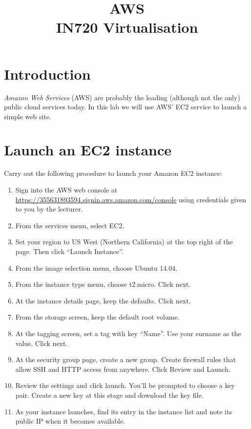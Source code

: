 \documentclass{article}
\begin{document}
\title{AWS\\ IN720 Virtualisation}
\date{}
\maketitle

\section*{Introduction}
\emph{Amazon Web Services} (AWS) are probably the leading (although not the only) public cloud services today. In this lab we will use AWS' EC2 service to launch a simple web site.

\section{Launch an EC2 instance}

Carry out the following procedure to launch your Amazon EC2 instance:

\begin{enumerate}

\item Sign into the AWS web console at \url{https://355631893594.signin.aws.amazon.com/console} using credentials given to you by the lecturer.

\item From the services menu, select EC2.

\item Set your region to US West (Northern California) at the top right of the page. Then click ``Launch Instance''.

\item From the image selection menu, choose Ubuntu 14.04.

\item From the instance type menu, choose t2.micro.  Click next.

\item At the instance details page, keep the defaults. Click next.

\item From the storage screen, keep the default root volume.

\item At the tagging screen, set a tag with key ``Name''. Use your surname as the value.  Click next.

\item At the security group page, create a new group. Create firewall rules that allow SSH and HTTP access from anywhere. Click Review and Launch.

\item Review the settings and click launch.  You'll be prompted to choose a key pair. Create a new key at this stage and download the key file.

\item As your instance launches, find its entry in the instance list and note its public IP when it becomes available.

\end{enumerate}
\end{document}
